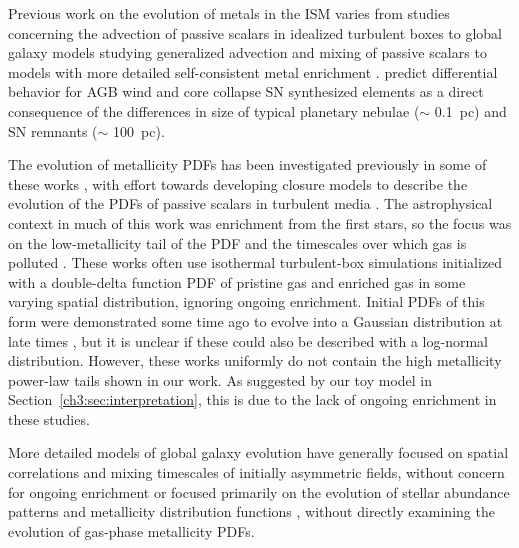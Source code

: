 Previous work on the evolution of metals in the ISM varies from studies concerning the advection of passive scalars in idealized turbulent boxes \citep[e.g.][]{Pope1991, PanScannapieco2010, PanScannapiecoScalo2012, PanScannapiecoScalo2013, YangKrumholz2012, SurPanScannapieco2014, Colbrook2017}
to global galaxy models studying generalized advection and mixing of passive scalars \citep[e.g.][]{deAvillez2002,Petit2015,Goldbaum2016} to models with more detailed self-consistent metal enrichment \citep[e.g.][]{Revaz2009,Escala2018}.
\cite{KrumholzTing2018} predict differential behavior for AGB wind and core collapse SN synthesized elements as a direct consequence of the differences in size of typical planetary nebulae ($\sim$ 0.1~pc) and SN remnants ($\sim$ 100~pc).

The evolution of metallicity PDFs has been investigated previously in some of these works \citep[see ][ and references therein]{PanScannapiecoScalo2012,PanScannapiecoScalo2013}, with effort towards developing closure models to describe the evolution of the PDFs of passive scalars in turbulent media \citep[e.g.][]{EswaranPope1988,Chen1989,Pope1991}. The astrophysical context in much of this work was enrichment from the first stars, so the focus was on the low-metallicity tail of the PDF and the timescales over which gas is polluted \citep[e.g.][]{PanScannapiecoScalo2013,Sarmento2017}. These works often use isothermal turbulent-box simulations initialized with a double-delta function PDF of pristine gas and enriched gas in some varying spatial distribution, ignoring ongoing enrichment. Initial PDFs of this form were demonstrated some time ago to evolve into a Gaussian distribution at late times \citep{EswaranPope1988}, but it is unclear if these could also be described with a log-normal distribution. However, these works uniformly do not contain the high metallicity power-law tails shown in our work. As suggested by our toy model in Section~\ref{ch3:sec:interpretation}, this is due to the lack of ongoing enrichment in these studies.

More detailed models of global galaxy evolution have generally focused on spatial correlations and mixing timescales of initially asymmetric fields, without concern for ongoing enrichment \citep[e.g.][]{deAvillez2002,Petit2015} or focused primarily on the evolution of stellar abundance patterns and metallicity distribution functions \citep[e.g][]{Jeon2017,Hirai2017,Escala2018}, without directly examining the evolution of gas-phase metallicity PDFs.

